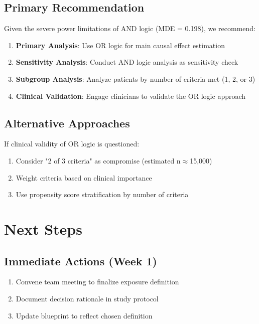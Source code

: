 \documentclass[11pt]{article}
\begin{document}
\subsection{Primary Recommendation}
Given the severe power limitations of AND logic (MDE = 0.198), we recommend:

\begin{enumerate}
    \item \textbf{Primary Analysis}: Use OR logic for main causal effect estimation
    \item \textbf{Sensitivity Analysis}: Conduct AND logic analysis as sensitivity check
    \item \textbf{Subgroup Analysis}: Analyze patients by number of criteria met (1, 2, or 3)
    \item \textbf{Clinical Validation}: Engage clinicians to validate the OR logic approach
\end{enumerate}

\subsection{Alternative Approaches}
If clinical validity of OR logic is questioned:
\begin{enumerate}
    \item Consider "2 of 3 criteria" as compromise (estimated n$\approx$15,000)
    \item Weight criteria based on clinical importance
    \item Use propensity score stratification by number of criteria
\end{enumerate}

\section{Next Steps}

\subsection{Immediate Actions (Week 1)}
\begin{enumerate}
    \item \textcolor{alertred}{Convene team meeting to finalize exposure definition}
    \item Document decision rationale in study protocol
    \item Update blueprint to reflect chosen definition
\end{enumerate}
\end{document}

